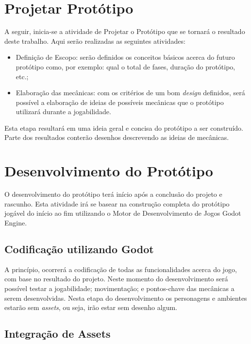 \section{Projetar Protótipo}

A seguir, inicia-se a atividade de Projetar o Protótipo que se tornará o resultado deste trabalho. Aqui serão realizadas as seguintes atividades:

\begin{itemize}
	\item Definição de Escopo: serão definidos os conceitos básicos acerca do futuro protótipo como, por exemplo: qual o total de fases, duração do protótipo, etc.;
	\item Elaboração das mecânicas: com os critérios de um bom \textit{design} definidos, será possível a elaboração de ideias de possíveis mecânicas que o protótipo utilizará durante a jogabilidade.
\end{itemize}

Esta etapa resultará em uma ideia geral e concisa do protótipo a ser construído. Parte dos resultados conterão desenhos descrevendo as ideias de mecânicas.

\section{Desenvolvimento do Protótipo}

O desenvolvimento do protótipo terá início após a conclusão do projeto e rascunho. Esta atividade irá se basear na construção completa do protótipo jogável do início ao fim utilizando o Motor de Desenvolvimento de Jogos Godot Engine.

\subsection{Codificação utilizando Godot}

A princípio, ocorrerá a codificação de todas as funcionalidades acerca do jogo, com base no resultado do projeto. Neste momento do desenvolvimento será possível testar a jogabilidade; movimentação; e pontos-chave das mecânicas a serem desenvolvidas. Nesta etapa do desenvolvimento os personagens e ambientes estarão sem \textit{assets}, ou seja, irão estar sem desenho algum. 

\subsection{Integração de Assets}

